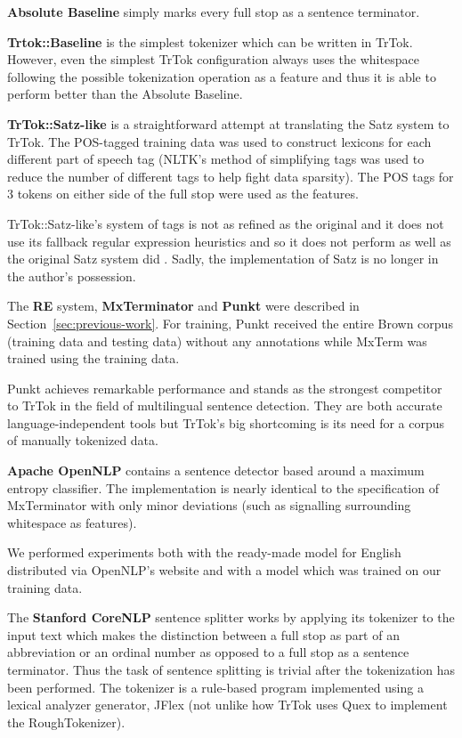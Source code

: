 \textbf{Absolute Baseline} simply marks every full stop as a sentence
terminator.

\textbf{Trtok::Baseline} is the simplest tokenizer which can be
written in TrTok. However, even the simplest TrTok configuration
always uses the whitespace following the possible tokenization
operation as a feature and thus it is able to perform better than the
Absolute Baseline.

\textbf{TrTok::Satz-like} is a straightforward attempt at translating
the Satz system to TrTok. The POS-tagged training data was used to
construct lexicons for each different part of speech tag (NLTK's
method of simplifying tags was used to reduce the number of different
tags to help fight data sparsity). The POS tags for 3 tokens on either
side of the full stop were used as the features.

TrTok::Satz-like's system of tags is not as refined as the original
and it does not use its fallback regular expression heuristics and so
it does not perform as well as the original Satz system did
\cite{sbd-satz}. Sadly, the implementation of Satz is no longer in the
author's possession.

The \textbf{RE} system, \textbf{MxTerminator} and \textbf{Punkt} were
described in Section~\ref{sec:previous-work}. For training, Punkt
received the entire Brown corpus (training data and testing data)
without any annotations while MxTerm was trained using the training
data.

Punkt achieves remarkable performance and stands as the strongest
competitor to TrTok in the field of multilingual sentence detection.
They are both accurate language-independent tools but TrTok's big
shortcoming is its need for a corpus of manually tokenized data.

\textbf{Apache OpenNLP} contains a sentence detector based around a
maximum entropy classifier. The implementation is nearly identical to
the specification of MxTerminator with only minor deviations (such as
signalling surrounding whitespace as features).

We performed experiments both with the ready-made model for English
distributed via OpenNLP's website and with a model which was trained
on our training data.

The \textbf{Stanford CoreNLP} sentence splitter works by applying its
tokenizer to the input text which makes the distinction between a full
stop as part of an abbreviation or an ordinal number as opposed to a
full stop as a sentence terminator. Thus the task of sentence
splitting is trivial after the tokenization has been performed. The
tokenizer is a rule-based program implemented using a lexical analyzer
generator, JFlex (not unlike how TrTok uses Quex to implement the
RoughTokenizer).

